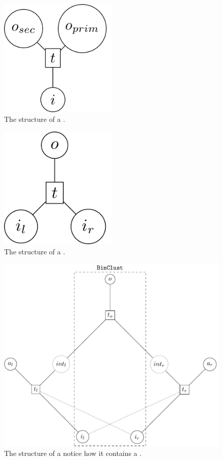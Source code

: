 \begin{figure}[H]
  \centering
  \includegraphics[width=0.5\textwidth]{./imgs/unclust.pdf}
  \caption{\label{fig:unclust}The structure of a .}
\end{figure}


\begin{figure}[H]
  \centering
  \includegraphics[width=0.5\textwidth]{./imgs/binclust.pdf}

  \caption{\label{fig:binclust}The structure of a .}
\end{figure}


\begin{figure}[H]
  \centering
  \includegraphics[width=.9\linewidth]{./imgs/joinclust.pdf}

  \caption{\label{fig:joinclust}The structure of a 
    notice how it contains a .}
\end{figure}

